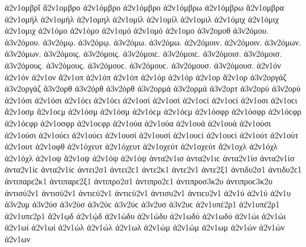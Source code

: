 {ἀ2ν1ομβρῖ 
ἄ2ν1ομβρο   %
ἀ2ν1όμβρο ἀ2ν1όμβρο 
ἀ2ν1όμβρω ἀ2ν1όμβρω 
ἄ2ν1ομβρα 
ἀ2ν1ομήλ ἀ2ν1ομήλ   %
ἀ2ν1ομηλ 
ἀ2ν1ομίλ ἀ2ν1ομίλ   %
ἀ2ν1ομιλ 
ἀ2ν1όμιχ ἀ2ν1όμιχ   %
ἀ2ν1ομιχ 
ἀ2ν1όμο ἀ2ν1όμο   %
ἀ2ν1ομό ἀ2ν1ομό 
ἀ2ν1ομο   %
ἀ3ν2ομοθ   %
ἀ3ν2όμου. ἀ3ν2όμου.   %
ἀ3ν2όμῳ. ἀ3ν2όμῳ. 
ἀ3ν2όμω. ἀ3ν2όμω. 
ἀ2ν2όμοιν. ἀ2ν2όμοιν. 
ἀ3ν2όμων. ἀ3ν2όμων. 
ἀ3ν2όμοις. ἀ3ν2όμοις. ἀ3ν2όμοιϲ. ἀ3ν2όμοιϲ. 
ἀ3ν2όμοισ. ἀ3ν2όμοισ. 
ἀ3ν2όμους. ἀ3ν2όμους. ἀ3ν2όμουϲ. ἀ3ν2όμουϲ. 
ἀ3ν2όμουσ. ἀ3ν2όμουσ. 
ἀ2ν1όν ἀ2ν1όν   %
ἀ2ν1ον 
ἄ2ν1οπ   %
ἀ2ν1όπ ἀ2ν1όπ 
ἀ2ν1όρ ἀ2ν1όρ   %
ἀ2ν1ορ 
ἄ2ν1ορ   %
ἀ3ν2οργάζ ἀ3ν2οργάζ   %
ἄ3ν2ορθ   %
ἀ3ν2όρθ ἀ3ν2όρθ 
ἀ3ν2ορμά ἀ3ν2ορμά   %
ἀ3ν2ορτ   %
ἀ3ν2ορύ ἀ3ν2ορύ   %
ἀ2ν1όσι ἀ2ν1όσι ἀ2ν1όϲι ἀ2ν1όϲι   %
ἀ2ν1οσί ἀ2ν1οσί ἀ2ν1οϲί ἀ2ν1οϲί 
ἀ2ν1οσι ἀ2ν1οϲι   %
ἄ2ν1οσμ ἄ2ν1οϲμ   %
ἀ2ν1όσμ ἀ2ν1όσμ ἀ2ν1όϲμ ἀ2ν1όϲμ 
ἀ2ν1όσφρ ἀ2ν1όσφρ ἀ2ν1όϲφρ ἀ2ν1όϲφρ   %
ἀ2ν1οσφρ ἀ2ν1οϲφρ 
ἀ2ν1ούα ἀ2ν1ούα   %
ἀ2ν1ουά ἀ2ν1ουά 
ἀ2ν1ούσι ἀ2ν1ούσι ἀ2ν1ούϲι ἀ2ν1ούϲι   %
ἀ2ν1ουσί ἀ2ν1ουσί ἀ2ν1ουϲί ἀ2ν1ουϲί 
ἀ2ν1ούτ ἀ2ν1ούτ   %
ἀ2ν1ουτ 
ἀ2ν1οφθ   %
ἀ2ν1όχευτ ἀ2ν1όχευτ   %
ἀ2ν1οχεύτ ἀ2ν1οχεύτ 
ἄ2ν1οχλ   %
ἀ2ν1όχλ ἀ2ν1όχλ 
ἀ2ν1οψ   %
ἄ2ν1οψ   %
ἀ2ν1όψ ἀ2ν1όψ 
ἀντα2ν1ισ ἀντα2ν1ιϲ   %
ἀντα2ν1ίσ ἀντα2ν1ίσ ἀντα2ν1ίϲ ἀντα2ν1ίϲ   %
ἀντει2σ1 ἀντει2ϲ1   %
ἀντε2κ1   %
ἀντε2ν1   %
ἀντε2ξ1   %
ἀντιδυ2σ1 ἀντιδυ2ϲ1   %
ἀντιπαρε2κ1   %
ἀντιπαρε2ξ1   %
ἀντιπρο2σ1 ἀντιπρο2ϲ1   %
ἀντιπροσ3κ2υ ἀντιπροϲ3κ2υ   %
ἀντισύ2ν1 ἀντισύ2ν1 ἀντιϲύ2ν1 ἀντιϲύ2ν1   %
ἀντισυ2ν1 ἀντιϲυ2ν1 
ἀ2ν1ύ ἀ2ν1ύ   %
ἀ2ν1υ 
ἀ3ν2υμ   %
ἀ3ν2ύσ ἀ3ν2ύσ ἀ3ν2ύϲ ἀ3ν2ύϲ   %
ἀ3ν2υσ ἀ3ν2υϲ   %
ἀ2ν1υπέ2ρ1 ἀ2ν1υπέ2ρ1   %
ἀ2ν1υπε2ρ1 
ἄ2ν1ῳδ   %
ἀ2ν1ῴδ 
ἀ2ν1ώδυ ἀ2ν1ώδυ   %
ἀ2ν1ωδύ ἀ2ν1ωδύ   %
ἀ2ν1ώι ἀ2ν1ώι   %
ἀ2ν1ωί ἀ2ν1ωί 
ἀ2ν1ώλ ἀ2ν1ώλ   %
ἀ2ν1ωλ 
ἀ2ν1ώμ ἀ2ν1ώμ   %
ἀ2ν1ωμ 
ἀ2ν1ών ἀ2ν1ών   %
ἀ2ν1ων 
}
